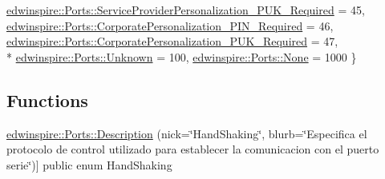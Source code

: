 \begin{DoxyCompactItemize}
\hyperlink{namespaceedwinspire_1_1_ports_a791799a5b274b8e0c84444482227c033a2fd533297f0c9209d59d97bca992bb59}{edwinspire\-::\-Ports\-::\-Service\-Provider\-Personalization\-\_\-\-P\-U\-K\-\_\-\-Required} =  45, 
\hyperlink{namespaceedwinspire_1_1_ports_a791799a5b274b8e0c84444482227c033aa273d1f169bf21401b927da40b1b3064}{edwinspire\-::\-Ports\-::\-Corporate\-Personalization\-\_\-\-P\-I\-N\-\_\-\-Required} =  46, 
\hyperlink{namespaceedwinspire_1_1_ports_a791799a5b274b8e0c84444482227c033a0a6b2cb46e44cb110051c0e367724348}{edwinspire\-::\-Ports\-::\-Corporate\-Personalization\-\_\-\-P\-U\-K\-\_\-\-Required} =  47, 
\\*
\hyperlink{namespaceedwinspire_1_1_ports_a791799a5b274b8e0c84444482227c033a0f9cd9d5f4d88eaee7c0bfd67209b373}{edwinspire\-::\-Ports\-::\-Unknown} =  100, 
\hyperlink{namespaceedwinspire_1_1_ports_a791799a5b274b8e0c84444482227c033ab81c145f75c6ff159a38f7dc7fa76aed}{edwinspire\-::\-Ports\-::\-None} =  1000
 \}
\end{DoxyCompactItemize}
\subsection*{Functions}
\begin{DoxyCompactItemize}
\item 
\hyperlink{namespaceedwinspire_1_1_ports_ae37a3d455fff2d5cd390697583285773}{edwinspire\-::\-Ports\-::\-Description} (nick=\char`\"{}Hand\-Shaking\char`\"{}, blurb=\char`\"{}Especifica el protocolo de control utilizado para establecer la comunicacion con el puerto serie\char`\"{})\mbox{]} public enum Hand\-Shaking
\end{DoxyCompactItemize}
